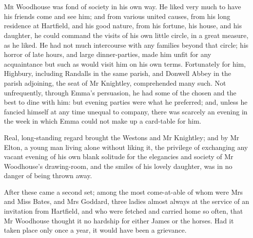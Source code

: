 \chapter[Chapter \thechapter]{}
\lettrine[lraise=0.3]{M}{r} Woodhouse was fond of society in his own way. He liked very much to have his friends come and see him; and from various united causes, from his long residence at Hartfield, and his good nature, from his fortune, his house, and his daughter, he could command the visits of his own little circle, in a great measure, as he liked. He had not much intercourse with any families beyond that circle; his horror of late hours, and large dinner-parties, made him unfit for any acquaintance but such as would visit him on his own terms. Fortunately for him, Highbury, including Randalls in the same parish, and Donwell Abbey in the parish adjoining, the seat of Mr Knightley, comprehended many such. Not unfrequently, through Emma's persuasion, he had some of the chosen and the best to dine with him: but evening parties were what he preferred; and, unless he fancied himself at any time unequal to company, there was scarcely an evening in the week in which Emma could not make up a card-table for him.

Real, long-standing regard brought the Westons and Mr Knightley; and by Mr Elton, a young man living alone without liking it, the privilege of exchanging any vacant evening of his own blank solitude for the elegancies and society of Mr Woodhouse's drawing-room, and the smiles of his lovely daughter, was in no danger of being thrown away.

After these came a second set; among the most come-at-able of whom were Mrs and Miss Bates, and Mrs Goddard, three ladies almost always at the service of an invitation from Hartfield, and who were fetched and carried home so often, that Mr Woodhouse thought it no hardship for either James or the horses. Had it taken place only once a year, it would have been a grievance.

